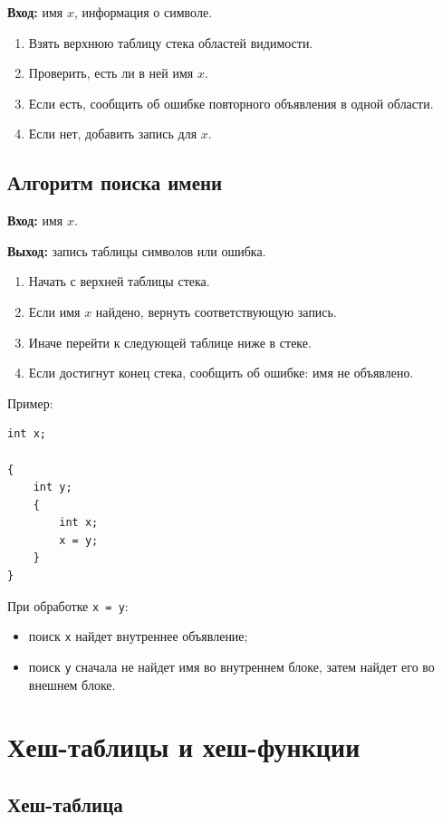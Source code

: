 \documentclass[12pt,a4paper]{article}
\begin{document}
\textbf{Вход:} имя $x$, информация о символе.

\begin{enumerate}
    \item Взять верхнюю таблицу стека областей видимости.
    \item Проверить, есть ли в ней имя $x$.
    \item Если есть, сообщить об ошибке повторного объявления в одной области.
    \item Если нет, добавить запись для $x$.
\end{enumerate}

\subsection{Алгоритм поиска имени}

\textbf{Вход:} имя $x$.

\textbf{Выход:} запись таблицы символов или ошибка.

\begin{enumerate}
    \item Начать с верхней таблицы стека.
    \item Если имя $x$ найдено, вернуть соответствующую запись.
    \item Иначе перейти к следующей таблице ниже в стеке.
    \item Если достигнут конец стека, сообщить об ошибке: имя не объявлено.
\end{enumerate}

Пример:

\begin{lstlisting}
int x;

{
    int y;
    {
        int x;
        x = y;
    }
}
\end{lstlisting}

При обработке \texttt{x = y}:

\begin{itemize}
    \item поиск \texttt{x} найдет внутреннее объявление;
    \item поиск \texttt{y} сначала не найдет имя во внутреннем блоке, затем найдет его во внешнем блоке.
\end{itemize}

\section{Хеш-таблицы и хеш-функции}

\subsection{Хеш-таблица}
\end{document}
